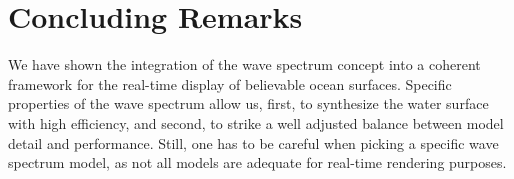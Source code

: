 \section{Concluding Remarks}
We have shown the integration of the wave spectrum concept into a
coherent framework for the real-time display of believable ocean
surfaces. Specific properties of the wave spectrum allow us, first,
to synthesize the water surface with high efficiency, and second, to
strike a well adjusted balance between model detail and performance.
Still, one has to be careful when picking a specific wave spectrum
model, as not all models are adequate for real-time rendering purposes.
% 
%
%

